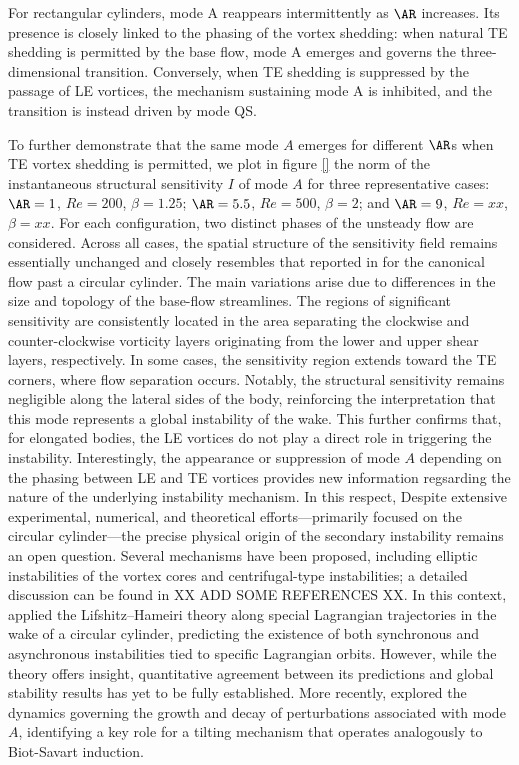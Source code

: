 For rectangular cylinders, mode A reappears intermittently as $\AR$ increases. Its presence is closely linked to the phasing of the vortex shedding: when natural TE shedding is permitted by the base flow, mode A emerges and governs the three-dimensional transition. Conversely, when TE shedding is suppressed by the passage of LE vortices, the mechanism sustaining mode A is inhibited, and the transition is instead driven by mode QS.

To further demonstrate that the same mode $A$ emerges for different $\AR$s when TE vortex shedding is permitted, we plot in figure \ref{} the norm of the instantaneous structural sensitivity $I$ of mode $A$ for three representative cases: $\AR=1$, $Re=200$, $\beta=1.25$; $\AR=5.5$, $Re=500$, $\beta=2$; and $\AR=9$, $Re=xx$, $\beta=xx$. For each configuration, two distinct phases of the unsteady flow are considered. Across all cases, the spatial structure of the sensitivity field remains essentially unchanged and closely resembles that reported in \cite{} for the canonical flow past a circular cylinder. The main variations arise due to differences in the size and topology of the base-flow streamlines.
%
The regions of significant sensitivity are consistently located in the area separating the clockwise and counter-clockwise vorticity layers originating from the lower and upper shear layers, respectively. In some cases, the sensitivity region extends toward the TE corners, where flow separation occurs. Notably, the structural sensitivity remains negligible along the lateral sides of the body, reinforcing the interpretation that this mode represents a global instability of the wake. This further confirms that, for elongated bodies, the LE vortices do not play a direct role in triggering the instability.
%
Interestingly, the appearance or suppression of mode $A$ depending on the phasing between LE and TE vortices provides new information regsarding the nature of the underlying instability mechanism. In this respect, Despite extensive experimental, numerical, and theoretical efforts---primarily focused on the circular cylinder---the precise physical origin of the secondary instability remains an open question. Several mechanisms have been proposed, including elliptic instabilities of the vortex cores \citep{williamson-1996,leweke-williamson-1998} and centrifugal-type instabilities; a detailed discussion can be found in \cite{thompson-etal-2001} XX ADD SOME REFERENCES XX.
%
In this context, \cite{giannetti-2015} applied the Lifshitz–Hameiri theory along special Lagrangian trajectories in the wake of a circular cylinder, predicting the existence of both synchronous and asynchronous instabilities tied to specific Lagrangian orbits. However, while the theory offers insight, quantitative agreement between its predictions and global stability results has yet to be fully established. More recently, \cite{aleksyuk-heil-2023} explored the dynamics governing the growth and decay of perturbations associated with mode $A$, identifying a key role for a tilting mechanism that operates analogously to Biot-Savart induction.
